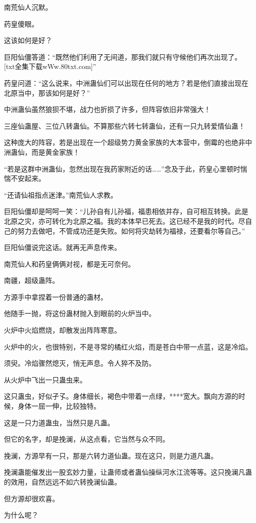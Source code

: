 \begin{this_body}
南荒仙人沉默。

药皇傻眼。

这该如何是好？

巨阳仙僵答道：“既然他们利用了无间道，那我们就只有守候他们再次出现了。[txt全集下载wWw.80txt.com]”

药皇问道：“这么说来，中洲蛊仙们可以出现在任何的地方？若是他们直接出现在北原当中，那该如何是好？”

中洲蛊仙虽然狼狈不堪，战力也折损了许多，但阵容依旧非常强大！

三座仙蛊屋、三位八转蛊仙。不算那些六转七转蛊仙，还有一只九转爱情仙蛊！

这种庞大的阵容，若是出现在一个超级势力黄金家族的大本营中，倒霉的也绝非中洲蛊仙，而是黄金家族！

“若是这群中洲蛊仙，忽然出现在我药家附近的话……”念及于此，药皇心里顿时惴惴不安起来。

“还请仙祖指点迷津。”南荒仙人求教。

巨阳仙僵却是呵呵一笑：“儿孙自有儿孙福，福患相依并存，自可相互转换。此是北原之灾，亦可转化为北原之福。我的本体早已死去。这已经不是我的时代。尽自己的努力去做吧，不管成功还是失败。如何将灾劫转为福禄，还要看尔等自己。”

巨阳仙僵说完这话。就再无声息传来。

南荒仙人和药皇俩俩对视，都是无可奈何。

南疆，超级蛊阵。

方源手中拿捏着一份普通的蛊材。

他随手一抛，将这份蛊材抛入到眼前的火炉当中。

火炉中火焰燃烧，却散发出阵阵寒意。

火炉中的火，也很特别，不是寻常的橘红火焰，而是苍白中带一点蓝，这是冷焰。

须臾。冷焰骤然熄灭，悄无声息。令人猝不及防。

从火炉中飞出一只蛊虫来。

这只蛊虫，好似孑孓。身体细长，褐色中带着一点绿，****宽大。飘向方源的时候，身体一屈一伸，比较独特。

这是一只力道蛊虫，当然只是凡蛊。

但它的名字，却是挽澜，从这点看，它当然与众不同。

挽澜，方源早有一只，那是六转力道仙蛊。现在这只，则是力道凡蛊。

挽澜蛊能催发出一股玄妙力量，让蛊师或者蛊仙操纵河水江流等等。这只挽澜凡蛊的效用，自然远远不如六转挽澜仙蛊。

但方源却很欢喜。

为什么呢？


\end{this_body}

